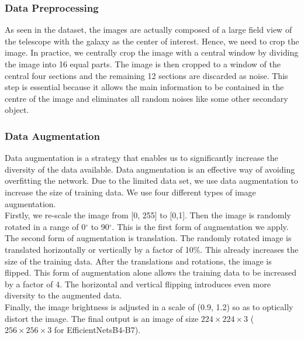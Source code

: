 \documentclass[fleqn,usenatbib]{mnras}
\begin{document}
\subsubsection{Data Preprocessing}
\hspace{0.25 in}As seen in the dataset, the images are actually composed of a large field view of the telescope with the galaxy as the center of interest. Hence, we need to crop the image. In practice, we centrally crop the image with a central window by dividing the image into 16 equal parts. The image is then cropped to a window of the central four sections and the remaining 12 sections are discarded as noise. This step is essential because it allows the main information to be contained in the centre of the image and eliminates all random noises like some other secondary object. 
\subsubsection{Data Augmentation}
\hspace{0.25 in}Data augmentation is a strategy that enables us to significantly increase the diversity of the data available. Data augmentation is an effective way of avoiding overfitting the network. Due to the limited data set, we use data augmentation to increase the size of training data. We use four different types of image augmentation. \\
\hspace{0.25 in}Firstly, we re-scale the image from [0, 255] to [0,1]. Then the image is randomly rotated in a range of 0$^\circ$ to 90$^\circ$. This is the first form of augmentation we apply. The second form of augmentation is translation. The randomly rotated image is translated horizontally or vertically by a factor of 10\%. This already increases the size of the training data. After the translations and rotations, the image is flipped. This form of augmentation alone allows the training data to be increased by a factor of 4. The horizontal and vertical flipping introduces even more diversity to the augmented data.\\
\hspace{0.25 in}Finally, the image brightness is adjusted in a scale of (0.9, 1.2) so as to optically distort the image. The final output is an image of size $224\times224\times3$ ($256\times256\times3$ for EfficientNetsB4-B7).
\end{document}
